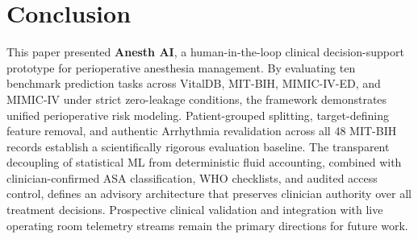 \documentclass[conference]{IEEEtran}
\begin{document}
\section{Conclusion}
This paper presented \textbf{Anesth AI}, a human-in-the-loop clinical decision-support prototype for perioperative anesthesia management. By evaluating ten benchmark prediction tasks across VitalDB, MIT-BIH, MIMIC-IV-ED, and MIMIC-IV under strict zero-leakage conditions, the framework demonstrates unified perioperative risk modeling. Patient-grouped splitting, target-defining feature removal, and authentic Arrhythmia revalidation across all 48 MIT-BIH records establish a scientifically rigorous evaluation baseline. The transparent decoupling of statistical ML from deterministic fluid accounting, combined with clinician-confirmed ASA classification, WHO checklists, and audited access control, defines an advisory architecture that preserves clinician authority over all treatment decisions. Prospective clinical validation and integration with live operating room telemetry streams remain the primary directions for future work.
\end{document}
